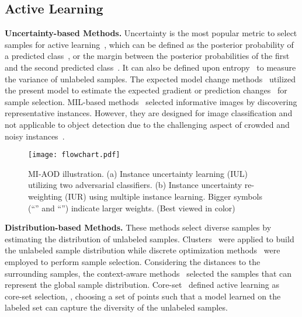 \documentclass[final]{cvpr}
\begin{document}
\subsection{Active Learning}


\textbf{Uncertainty-based Methods.} Uncertainty is the most popular metric to select samples for active learning~\cite{Survey12}, which can be defined as the posterior probability of a predicted class~\cite{TextClassifier94, Heterogeneous94}, or the margin between the posterior probabilities of the first and the second predicted class~\cite{MultiClass09, MarginBased06}. It can also be defined upon entropy~\cite{SequenceLabel08, LatentStruct13, MultiClass09} to measure the variance of unlabeled samples. 
The expected model change methods~\cite{ErrorReduction01,MultiInstance07} utilized the present model to estimate the expected gradient or prediction changes~\cite{SelectInfluent14, ActiveContinuous16} for sample selection. MIL-based methods~\cite{MultiInstance07, MultiInstanceLabel17, IncorpDiver17, BagLevelAggre19} selected informative images by discovering representative instances. However, they are designed for image classification and not applicable to object detection due to the challenging aspect of crowded and noisy instances~\cite{MinEntropy2019,CMIL2019}.

\begin{figure*}[t]
    \centering
    \texttt{[image: flowchart.pdf]}
    \caption{MI-AOD illustration. (a) Instance uncertainty learning (IUL) utilizing two adversarial classifiers. (b) Instance uncertainty re-weighting (IUR) using multiple instance learning. Bigger symbols (``'' and ``'') indicate larger weights. (Best viewed in color)}
    \label{fig:illustration}
\end{figure*}

\textbf{Distribution-based Methods.} These methods select diverse samples by estimating the distribution of unlabeled samples. Clusters~\cite{PreCluster04} were applied to build the unlabeled sample distribution while discrete optimization methods~\cite{MatrixPartition10,ConvexOptim13,MultiClassUncerDiver15} were employed to perform sample selection. Considering the distances to the surrounding samples, the context-aware methods~\cite{ContextAware15, HierarchicalSubquery14} selected the samples that can represent the global sample distribution. Core-set~\cite{CoreSet18} defined active learning as core-set selection, \ie, choosing a set of points such that a model learned on the labeled set can capture the diversity of the unlabeled samples. 
\end{document}
